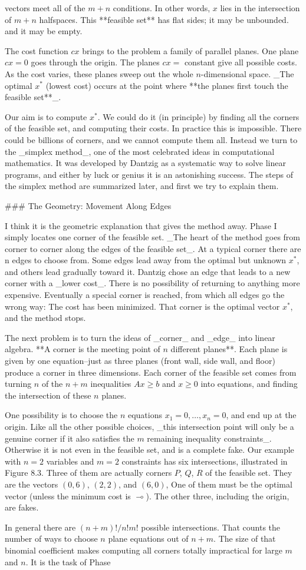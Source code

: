 vectors meet all of the \(m+n\) conditions. In other words, \(x\) lies in the intersection of \(m+n\) halfspaces. This **feasible set** has flat sides; it may be unbounded. and it may be empty.

The cost function \(cx\) brings to the problem a family of parallel planes. One plane \(cx=0\) goes through the origin. The planes \(cx=\) constant give all possible costs. As the cost varies, these planes sweep out the whole \(n\)-dimensional space. _The optimal \(x^{*}\) (lowest cost) occurs at the point where **the planes first touch the feasible set**_.

Our aim is to compute \(x^{*}\). We could do it (in principle) by finding all the corners of the feasible set, and computing their costs. In practice this is impossible. There could be billions of corners, and we cannot compute them all. Instead we turn to the _simplex method_, one of the most celebrated ideas in computational mathematics. It was developed by Dantzig as a systematic way to solve linear programs, and either by luck or genius it is an astonishing success. The steps of the simplex method are summarized later, and first we try to explain them.

### The Geometry: Movement Along Edges

I think it is the geometric explanation that gives the method away. Phase I simply locates one corner of the feasible set. _The heart of the method goes from corner to corner along the edges of the feasible set_. At a typical corner there are n edges to choose from. Some edges lead away from the optimal but unknown \(x^{*}\), and others lead gradually toward it. Dantzig chose an edge that leads to a new corner with a _lower cost_. There is no possibility of returning to anything more expensive. Eventually a special corner is reached, from which all edges go the wrong way: The cost has been minimized. That corner is the optimal vector \(x^{*}\), and the method stops.

The next problem is to turn the ideas of _corner_ and _edge_ into linear algebra. **A corner is the meeting point of \(n\) different planes**. Each plane is given by one equation--just as three planes (front wall, side wall, and floor) produce a corner in three dimensions. Each corner of the feasible set comes from turning \(n\) of the \(n+m\) inequalities \(Ax\geq b\) and \(x\geq 0\) into equations, and finding the intersection of these \(n\) planes.

One possibility is to choose the \(n\) equations \(x_{1}=0,\ldots,x_{n}=0\), and end up at the origin. Like all the other possible choices, _this intersection point will only be a genuine corner if it also satisfies the \(m\) remaining inequality constraints_. Otherwise it is not even in the feasible set, and is a complete fake. Our example with \(n=2\) variables and \(m=2\) constraints has six intersections, illustrated in Figure 8.3. Three of them are actually corners \(P\), \(Q\), \(R\) of the feasible set. They are the vectors \((0,6)\), \((2,2)\), and \((6,0)\), One of them must be the optimal vector (unless the minimum cost is \(\multimap\)). The other three, including the origin, are fakes.

In general there are \((n+m)!/n!m!\) possible intersections. That counts the number of ways to choose \(n\) plane equations out of \(n+m\). The size of that binomial coefficient makes computing all corners totally impractical for large \(m\) and \(n\). It is the task of Phase 